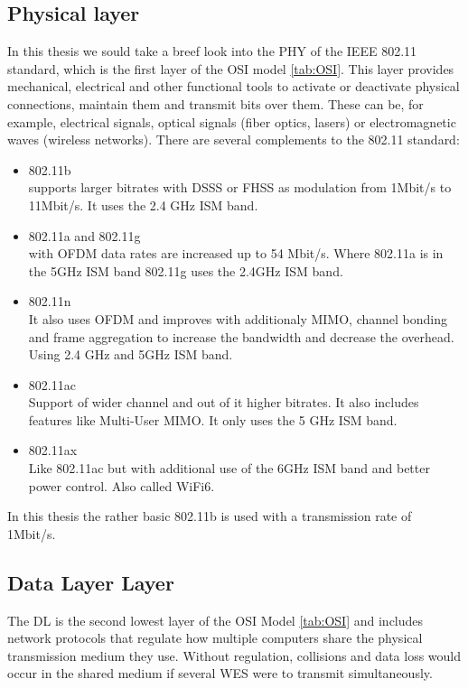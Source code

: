 \documentclass[]{ccs-thesis}
\begin{document}
\subsection{Physical layer}

In this thesis we sould take a breef look into the \ac{PHY} of the IEEE 802.11 standard, which is the first layer of the OSI model \ref{tab:OSI}.
This layer provides mechanical, electrical and other functional tools to activate or deactivate physical connections, maintain them and transmit bits over them. 
These can be, for example, electrical signals, optical signals (fiber optics, lasers) or electromagnetic waves (wireless networks).
There are several complements to the 802.11 standard:

\begin{itemize}
	\item 802.11b \\
	supports larger bitrates with \ac{DSSS} or \ac{FHSS} as modulation from 1Mbit/s to 11Mbit/s.
	It uses the 2.4 GHz ISM band.
	\item 802.11a and 802.11g \\
	with \ac{OFDM} data rates are increased up to 54 Mbit/s.
	Where 802.11a is in the 5GHz ISM band 802.11g uses the 2.4GHz ISM band.
	\item 802.11n\\
	It also uses \ac{OFDM} and improves with additionaly \ac{MIMO}, channel bonding and frame aggregation to increase the bandwidth and decrease the overhead.
	Using 2.4 GHz and 5GHz ISM band.
	\item 802.11ac\\
	Support of wider channel and out of it higher bitrates. It also includes features like Multi-User MIMO.
	It only uses the 5 GHz ISM band.
	\item 802.11ax\\
	Like 802.11ac but with additional use of the 6GHz ISM band and better power control. 
	Also called WiFi6.
\end{itemize}

In this thesis the rather basic 802.11b is used with a transmission rate of 1Mbit/s.

\subsection{Data Layer Layer}

The \ac{DL} is the second lowest layer of the \ac{OSI} Model \ref{tab:OSI} and includes network protocols that regulate how multiple computers share the physical transmission medium they use. 
Without regulation, collisions and data loss would occur in the shared medium if several WES were to transmit simultaneously.
\end{document}
